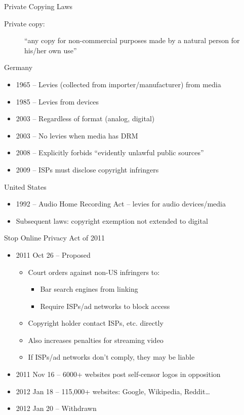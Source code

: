 \documentclass{beamer}
\begin{document}
\begin{frame}{Private Copying Laws}
\begin{description}
\item[Private copy:] ``any copy for non-commercial purposes made by a natural person for his/her own use''
\end{description}

Germany
\begin{itemize}
\item 1965 -- Levies (collected from importer/manufacturer) from media
\item 1985 -- Levies from devices
\item 2003 -- Regardless of format (analog, digital)
\item 2003 -- No levies when media has DRM
\item 2008 -- Explicitly forbids ``evidently unlawful public sources''
\item 2009 -- ISPs must disclose copyright infringers
\end{itemize}

\bigskip
United States
\begin{itemize}
\item 1992 -- Audio Home Recording Act -- levies for audio devices/media
\item Subsequent laws: copyright exemption not extended to digital
\end{itemize}
\end{frame}

\begin{frame}{Stop Online Privacy Act of 2011}
\begin{itemize}
\item 2011 Oct 26 -- Proposed
\begin{itemize}
\item Court orders against non-US infringers to:
\begin{itemize}
\item Bar search engines from linking
\item Require ISPs/ad networks to block access
\end{itemize}
\item Copyright holder contact ISPs, etc. directly
\item Also increases penalties for streaming video
\item If ISPs/ad networks don't comply, they may be liable
\end{itemize}
\item 2011 Nov 16 -- 6000+ websites post self-censor logos in opposition
\item 2012 Jan 18 -- 115,000+ websites: Google, Wikipedia, Reddit\ldots
\item 2012 Jan 20 -- Withdrawn
\end{itemize}
\end{frame}
\end{document}
